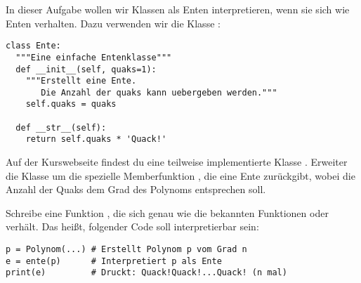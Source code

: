 \begin{aufg}
  In dieser Aufgabe wollen wir Klassen als Enten interpretieren, wenn sie sich wie Enten verhalten.
  Dazu verwenden wir die Klasse :
  \begin{lstlisting}
class Ente:
  """Eine einfache Entenklasse"""
  def __init__(self, quaks=1):
    """Erstellt eine Ente.
       Die Anzahl der quaks kann uebergeben werden."""
    self.quaks = quaks
  
  def __str__(self):
    return self.quaks * 'Quack!'
  \end{lstlisting}
  
  Auf der Kurswebseite findest du eine teilweise implementierte Klasse .
  Erweiter die Klasse  um die spezielle Memberfunktion ,
  die eine Ente zurückgibt, wobei die Anzahl der Quaks dem Grad des Polynoms entsprechen soll.
  
  Schreibe eine Funktion , die sich genau wie die bekannten Funktionen  oder  verhält.
  Das heißt, folgender Code soll interpretierbar sein:
  \begin{lstlisting}
p = Polynom(...) # Erstellt Polynom p vom Grad n
e = ente(p)      # Interpretiert p als Ente
print(e)         # Druckt: Quack!Quack!...Quack! (n mal)
  \end{lstlisting}

\end{aufg}
